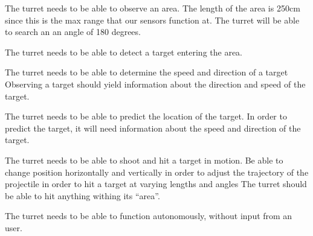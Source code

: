 The turret needs to be able to observe an area. The length of the area is 250cm
since this is the max range that our sensors function at. The turret will be
able to search an an angle of 180 degrees.\nl

The turret needs to be able to detect a target entering the area.\nl

The turret needs to be able to determine the speed and direction of a target
Observing a target should yield information about the direction and speed of
the target.\nl

The turret needs to be able to predict the location of the target. In order to
predict the target, it will need information about the speed and direction of
the target.\nl

The turret needs to be able to shoot and hit a target in motion. Be able to
change position horizontally and vertically in order to adjust the trajectory
of the projectile in order to hit a target at varying lengths and angles The
turret should be able to hit anything withing its ``area''.\nl

The turret needs to be able to function autonomously, without input from an
user.\nl